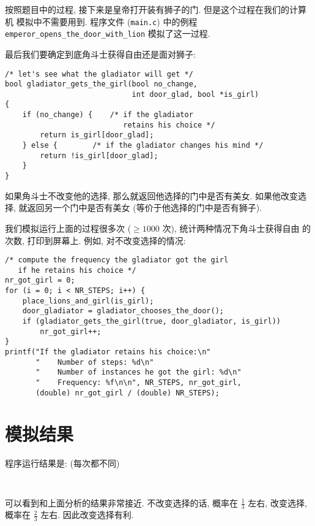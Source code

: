\documentclass{ctexart}
\def\makeinnocent#1{\catcode`#1=12}
\def\typeverb#1{{\obeylines\obeyspaces%
\tt\let\do=\makeinnocent \dospecials #1 }}
\def\inputverbatim#1{\typeverb{}}
\begin{document}
按照题目中的过程, 接下来是皇帝打开装有狮子的门. 但是这个过程在我们的计算机
模拟中不需要用到. 程序文件 (\verb|main.c|) 中的例程
\verb|emperor_opens_the_door_with_lion| 模拟了这一过程.

最后我们要确定到底角斗士获得自由还是面对狮子:
\begin{verbatim}
/* let's see what the gladiator will get */
bool gladiator_gets_the_girl(bool no_change,
                             int door_glad, bool *is_girl)
{
    if (no_change) {    /* if the gladiator
                           retains his choice */
        return is_girl[door_glad];
    } else {        /* if the gladiator changes his mind */
        return !is_girl[door_glad];
    }
}
\end{verbatim}
如果角斗士不改变他的选择, 那么就返回他选择的门中是否有美女. 如果他改变选择,
就返回另一个门中是否有美女 (等价于他选择的门中是否有狮子).

我们模拟运行上面的过程很多次 ($\ge 1000$ 次), 统计两种情况下角斗士获得自由
的次数, 打印到屏幕上. 例如, 对不改变选择的情况:
\begin{verbatim}
/* compute the frequency the gladiator got the girl
   if he retains his choice */
nr_got_girl = 0;
for (i = 0; i < NR_STEPS; i++) {
    place_lions_and_girl(is_girl);
    door_gladiator = gladiator_chooses_the_door();
    if (gladiator_gets_the_girl(true, door_gladiator, is_girl))
        nr_got_girl++;
}
printf("If the gladiator retains his choice:\n"
       "    Number of steps: %d\n"
       "    Number of instances he got the girl: %d\n"
       "    Frequency: %f\n\n", NR_STEPS, nr_got_girl,
       (double) nr_got_girl / (double) NR_STEPS);
\end{verbatim}

\section{模拟结果}
程序运行结果是: (每次都不同)

\inputverbatim{results}

可以看到和上面分析的结果非常接近. 不改变选择的话, 概率在 $\frac{1}{3}$
左右, 改变选择, 概率在 $\frac{2}{3}$ 左右. 因此改变选择有利.
\end{document}

